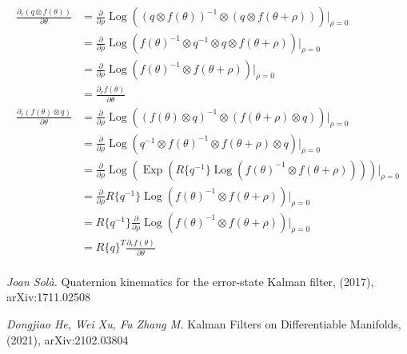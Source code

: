 \documentclass[12pt]{article}
\begin{document}
\begin{equation}
    \begin{aligned}
        \frac{\partial_r (q\otimes f(\theta))}{\partial \theta}
         & =\frac{\partial}{\partial \rho}
        \operatorname{Log}((q\otimes f(\theta))^{-1} \otimes (q\otimes f(\theta+\rho)))\Biggl |_{\rho=0}    \\
         & =\frac{\partial}{\partial \rho}
        \operatorname{Log}(f(\theta)^{-1} \otimes q^{-1} \otimes q \otimes f(\theta+\rho))\Biggl |_{\rho=0} \\
         & =\frac{\partial}{\partial \rho}
        \operatorname{Log}(f(\theta)^{-1} \otimes f(\theta+\rho))\Biggl |_{\rho=0}                          \\
         & =\frac{\partial_r f(\theta)}{\partial \theta}                                                    \\
        \frac{\partial_r (f(\theta) \otimes q)}{\partial \theta}
         & =\frac{\partial}{\partial \rho}
        \operatorname{Log}((f(\theta) \otimes q)^{-1} \otimes (f(\theta+\rho) \otimes q))\Biggl |_{\rho=0}  \\
         & =\frac{\partial}{\partial \rho}
        \operatorname{Log}(q^{-1} \otimes f(\theta)^{-1} \otimes f(\theta+\rho) \otimes q)\Biggl |_{\rho=0} \\
         & =\frac{\partial}{\partial \rho}
        \operatorname{Log}(
        \operatorname{Exp}(R\{q^{-1}\}
        \operatorname{Log}(f(\theta)^{-1} \otimes f(\theta+\rho)))
        )\Biggl |_{\rho=0}                                                                                  \\
         & =\frac{\partial}{\partial \rho}
        R\{q^{-1}\}\operatorname{Log}(f(\theta)^{-1} \otimes f(\theta+\rho))
        \Biggl |_{\rho=0}                                                                                   \\
         & =R\{q^{-1}\}\frac{\partial}{\partial \rho}
        \operatorname{Log}(f(\theta)^{-1} \otimes f(\theta+\rho))
        \Biggl |_{\rho=0}                                                                                   \\
         & =R\{q\}^T\frac{\partial_r f(\theta)}{\partial \theta}                                            \\
    \end{aligned}
\end{equation}

\newpage
\begin{thebibliography}{999}
    \textit{Joan Solà.} Quaternion kinematics for the error-state Kalman filter, (2017), arXiv:1711.02508 
    
    \textit{Dongjiao He, Wei Xu, Fu Zhang M.} Kalman Filters on Differentiable Manifolds, (2021), arXiv:2102.03804 

\end{thebibliography}
\end{document}
